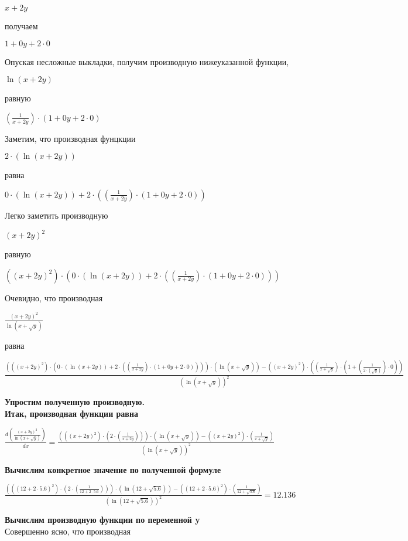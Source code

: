 \documentclass{article}
\theoremstyle{definition}
\begin{document}
\begin{center}$x + 2y$ \end{center}получаем
\begin{center}$1 + 0y + 2 \cdot 0$ \end{center}Опуская несложные выкладки, получим производную нижеуказанной функции,
\begin{center}$ \ln (x + 2y)$ \end{center}равную
\begin{center}$(\frac{1}{x + 2y}) \cdot (1 + 0y + 2 \cdot 0)$ \end{center}Заметим, что производная фунцкции
\begin{center}$2 \cdot ( \ln (x + 2y))$ \end{center}равна
\begin{center}$0 \cdot ( \ln (x + 2y)) + 2 \cdot ((\frac{1}{x + 2y}) \cdot (1 + 0y + 2 \cdot 0))$ \end{center}Легко заметить производную
\begin{center}$(x + 2y) ^ 2$ \end{center}равную
\begin{center}$((x + 2y) ^ 2) \cdot (0 \cdot ( \ln (x + 2y)) + 2 \cdot ((\frac{1}{x + 2y}) \cdot (1 + 0y + 2 \cdot 0)))$ \end{center}Очевидно, что производная
\begin{center}$\frac{(x + 2y) ^ 2}{ \ln (x +  \sqrt {y})}$ \end{center}равна
\begin{center}$\frac{(((x + 2y) ^ 2) \cdot (0 \cdot ( \ln (x + 2y)) + 2 \cdot ((\frac{1}{x + 2y}) \cdot (1 + 0y + 2 \cdot 0)))) \cdot ( \ln (x +  \sqrt {y})) - ((x + 2y) ^ 2) \cdot ((\frac{1}{x +  \sqrt {y}}) \cdot (1 + (\frac{1}{2 \cdot ( \sqrt {y})}) \cdot 0))}{( \ln (x +  \sqrt {y}))^ 2}$ \end{center}{\LARGE \bfseries \center Упростим полученную производную. \\}{\LARGE \bfseries \center Итак, производная функции равна \\}\begin{center}$\frac{d(\frac{(x + 2y) ^ 2}{ \ln (x +  \sqrt {y})})}{dx} = \frac{(((x + 2y) ^ 2) \cdot (2 \cdot (\frac{1}{x + 2y}))) \cdot ( \ln (x +  \sqrt {y})) - ((x + 2y) ^ 2) \cdot (\frac{1}{x +  \sqrt {y}})}{( \ln (x +  \sqrt {y}))^ 2}$ \end{center}{\LARGE \bfseries \center Вычислим конкретное значение по полученной формуле \\}\begin{center}$\frac{(((12 + 2 \cdot 5.6) ^ 2) \cdot (2 \cdot (\frac{1}{12 + 2 \cdot 5.6}))) \cdot ( \ln (12 +  \sqrt {5.6})) - ((12 + 2 \cdot 5.6) ^ 2) \cdot (\frac{1}{12 +  \sqrt {5.6}})}{( \ln (12 +  \sqrt {5.6}))^ 2} = 12.136$ \end{center}{\LARGE \bfseries \center Вычислим производную функции по переменной y \\}Совершенно ясно, что производная
\end{document}
